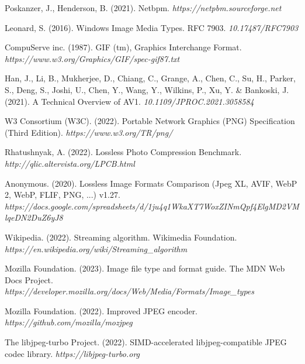 \documentclass[11pt,a4paper]{report}
\begin{document}
\begin{thebibliography}{9}

Poskanzer, J., Henderson, B. (2021). Netbpm. \textit{https://netpbm.sourceforge.net}

Leonard, S. (2016). Windows Image Media Types. RFC 7903. \textit{10.17487/RFC7903}

CompuServe inc. (1987). GIF (tm), Graphics Interchange Format. \textit{https://www.w3.org/Graphics/GIF/spec-gif87.txt}

Han, J., Li, B., Mukherjee, D., Chiang, C., Grange, A., Chen, C., Su, H., Parker, S., Deng, S., Joshi, U., Chen, Y., Wang, Y., Wilkins, P., Xu, Y. \& Bankoski, J. (2021). A Technical Overview of AV1. \textit{10.1109/JPROC.2021.3058584} 

W3 Consortium (W3C). (2022). Portable Network Graphics (PNG) Specification (Third Edition). \textit{https://www.w3.org/TR/png/}

Rhatushnyak, A. (2022). Lossless Photo Compression Benchmark. \textit{http://qlic.altervista.org/LPCB.html}

Anonymous. (2020). Lossless Image Formats Comparison (Jpeg XL, AVIF, WebP 2, WebP, FLIF, PNG, ...) v1.27. \textit{https://docs.google.com/spreadsheets/d/1ju4q1WkaXT7WoxZINmQpf4ElgMD2VMlqeDN2DuZ6yJ8}


Wikipedia. (2022). Streaming algorithm. Wikimedia Foundation. \textit{https://en.wikipedia.org/wiki/Streaming\_algorithm}

Mozilla Foundation. (2023). Image file type and format guide. The MDN Web Docs Project. \textit{https://developer.mozilla.org/docs/Web/Media/Formats/Image\_types}

Mozilla Foundation. (2022). Improved JPEG encoder. \textit{https://github.com/mozilla/mozjpeg}

The libjpeg-turbo Project. (2022). SIMD-accelerated libjpeg-compatible JPEG codec library.
\textit{https://libjpeg-turbo.org}


\end{thebibliography}
\end{document}
